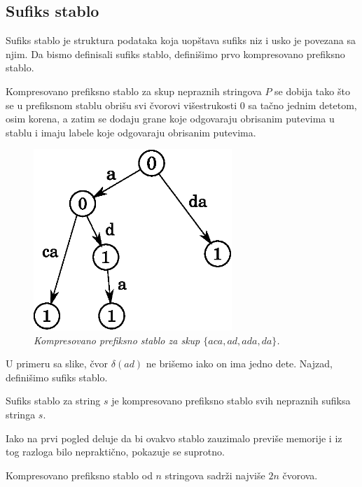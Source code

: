 \subsection{Sufiks stablo}

Sufiks stablo je struktura podataka koja uop\v stava sufiks niz i usko je povezana sa njim. Da bismo definisali sufiks stablo, defini\v simo prvo kompresovano prefiksno stablo.

\begin{dfn}
Kompresovano prefiksno stablo za skup nepraznih stringova $P$ se dobija tako \v sto se u prefiksnom stablu obri\v su svi \v cvorovi vi\v sestrukosti $0$ sa ta\v cno jednim detetom, osim korena, a zatim se dodaju grane koje odgovaraju obrisanim putevima u stablu i imaju labele koje odgovaraju obrisanim putevima.
\end{dfn}

\begin{figure}[H]
    \centering
    \includegraphics[width=75mm]{../img/ztrie1.eps}
    \caption*{\textit{Kompresovano prefiksno stablo za skup $\{aca,ad,ada,da\}$.}}
\end{figure}

U primeru sa slike, \v cvor $\delta(ad)$ ne bri\v semo iako on ima jedno dete. Najzad, defini\v simo sufiks stablo.

\begin{dfn}
Sufiks stablo za string $s$ je kompresovano prefiksno stablo svih nepraznih sufiksa stringa $s$.
\end{dfn}

Iako na prvi pogled deluje da bi ovakvo stablo zauzimalo previ\v se memorije i iz tog razloga bilo neprakti\v cno, pokazuje se suprotno.

\begin{thm}
Kompresovano prefiksno stablo od $n$ stringova sadr\v zi najvi\v se $2n$ \v cvorova. 
\end{thm}

